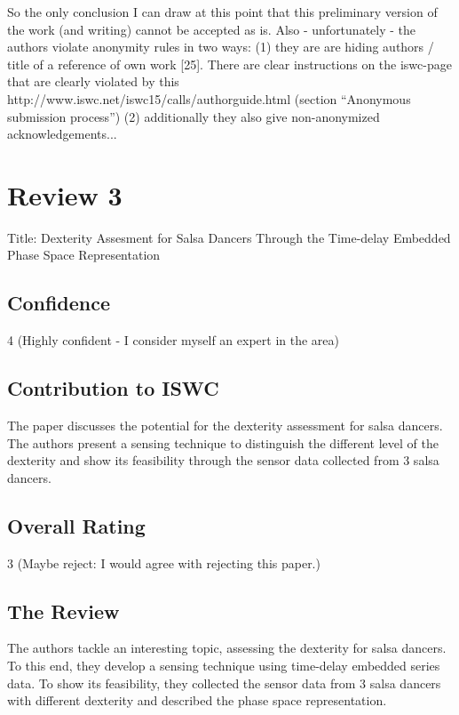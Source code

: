 \documentclass[8pt]{article}
\begin{document}
   So the only conclusion I can draw at this point that this preliminary
   version of the work (and writing) cannot be accepted as is. 
   Also - unfortunately - the authors violate anonymity rules in two ways:
   (1) they are are hiding authors / title of  a reference of own work  [25].
   There are clear instructions on the iswc-page that are clearly violated
   by this http://www.iswc.net/iswc15/calls/authorguide.html 
   (section ``Anonymous submission process'')
   (2) additionally they also give non-anonymized acknowledgements...
   
   
\section{Review 3}

Title: Dexterity Assesment for Salsa Dancers Through the Time-delay Embedded Phase Space Representation

\subsection{Confidence}
4  (Highly confident - I consider myself an expert in the area)

\subsection{Contribution to ISWC}
   The paper discusses the potential for the dexterity assessment for salsa
   dancers.  The authors present a sensing technique to distinguish the
   different level of the dexterity and show its feasibility through the
   sensor data collected from 3 salsa dancers.
   
\subsection{Overall Rating}
  3  (Maybe reject: I would agree with rejecting this paper.)
  
\subsection{The Review}
   The authors tackle an interesting topic, assessing the dexterity for
   salsa dancers. To this end, they develop a sensing technique using
   time-delay embedded series data. To show its feasibility, they collected
   the sensor data from 3 salsa dancers with different dexterity and
   described the phase space representation.
\end{document}
